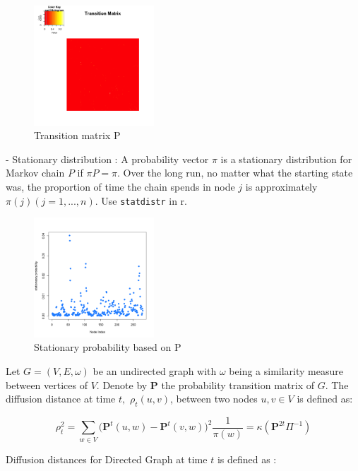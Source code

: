 \documentclass[12pt]{report}
\begin{document}
\begin{figure}[H]
\captionsetup{format=plain}
\centering
\includegraphics[width=0.4\textwidth]{../figure/trans.png}
\caption{Transition matrix P}
\label{fig:trans}
\end{figure}



- Stationary distribution 
: A probability vector $\pi$ is a stationary distribution for Markov chain $P$ if $\pi P = \pi$. Over the long run, no matter what the starting state was, the proportion of time the chain spends in node $j$ is approximately $\pi(j) (j = 1, ... , n)$.
Use \verb!statdistr! in r.


\begin{figure}[H]
\captionsetup{format=plain}
\centering
\includegraphics[width=0.4\textwidth]{../figure/statd.png}
\caption{Stationary probability based on P}
\label{fig:statd}
\end{figure}


  Let $G = (V, E, \omega)$ be an undirected graph with $\omega$ being a similarity measure between vertices of $V.$ Denote by $\textbf{P}$ the probability transition matrix of $G.$ The diffusion distance at time $t,$ $\rho_{t}(u,v)$, between two nodes $u,v \in V$ is defined as:
  
  $$\rho^2_{t} = \sum\limits_{w \in V}\big( \textbf{P}^{t}(u,w) - \textbf{P}^{t}(v,w) \big)^2 \frac{1}{\pi(w)} =  \kappa(\textbf{P}^{2t} \Pi^{-1} )$$

 
Diffusion distances for Directed Graph at time $t$ is defined as :
\end{document}
